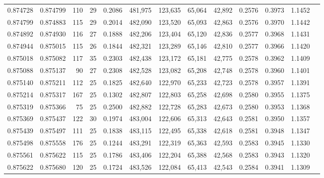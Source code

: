 \begin{tabular}{rrrrrrrrrrrrr}
0.874728 & 0.874799 &   110 &  29 &                                     0.2086 & 481,975 & 123,635 &  65,064 &  42,892 & 0.2576 & 0.3973 & 1.1452 \\
0.874799 & 0.874883 &   115 &  29 &                                     0.2014 & 482,090 & 123,520 &  65,093 &  42,863 & 0.2576 & 0.3970 & 1.1442 \\
0.874892 & 0.874930 &   116 &  27 &                                     0.1888 & 482,206 & 123,404 &  65,120 &  42,836 & 0.2577 & 0.3968 & 1.1431 \\
0.874944 & 0.875015 &   115 &  26 &                                     0.1844 & 482,321 & 123,289 &  65,146 &  42,810 & 0.2577 & 0.3966 & 1.1420 \\
0.875018 & 0.875082 &   117 &  35 &                                     0.2303 & 482,438 & 123,172 &  65,181 &  42,775 & 0.2578 & 0.3962 & 1.1409 \\
0.875088 & 0.875137 &    90 &  27 &                                     0.2308 & 482,528 & 123,082 &  65,208 &  42,748 & 0.2578 & 0.3960 & 1.1401 \\
0.875140 & 0.875211 &   112 &  25 &                                     0.1825 & 482,640 & 122,970 &  65,233 &  42,723 & 0.2578 & 0.3957 & 1.1391 \\
0.875214 & 0.875317 &   167 &  25 &                                     0.1302 & 482,807 & 122,803 &  65,258 &  42,698 & 0.2580 & 0.3955 & 1.1375 \\
0.875319 & 0.875366 &    75 &  25 &                                     0.2500 & 482,882 & 122,728 &  65,283 &  42,673 & 0.2580 & 0.3953 & 1.1368 \\
0.875369 & 0.875437 &   122 &  30 &                                     0.1974 & 483,004 & 122,606 &  65,313 &  42,643 & 0.2581 & 0.3950 & 1.1357 \\
0.875439 & 0.875497 &   111 &  25 &                                     0.1838 & 483,115 & 122,495 &  65,338 &  42,618 & 0.2581 & 0.3948 & 1.1347 \\
0.875498 & 0.875558 &   176 &  25 &                                     0.1244 & 483,291 & 122,319 &  65,363 &  42,593 & 0.2583 & 0.3945 & 1.1330 \\
0.875561 & 0.875622 &   115 &  25 &                                     0.1786 & 483,406 & 122,204 &  65,388 &  42,568 & 0.2583 & 0.3943 & 1.1320 \\
0.875622 & 0.875680 &   120 &  25 &                                     0.1724 & 483,526 & 122,084 &  65,413 &  42,543 & 0.2584 & 0.3941 & 1.1309 \\

\end{tabular}
